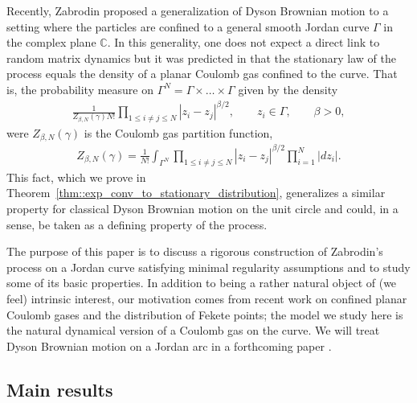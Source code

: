 \documentclass[11pt]{article}
\numberwithin{equation}{section}
\theoremstyle{definition}
\begin{document}
Recently, Zabrodin \cite{zabrodin2023dyson} proposed a generalization of Dyson Brownian motion to a setting where the particles are confined to a general smooth Jordan curve $\Gamma$ in the complex plane $\mathbb{C}$. In this generality, one does not expect a direct link to random matrix dynamics but it was predicted in \cite{zabrodin2023dyson} that the stationary law of the process equals the density of a planar Coulomb gas confined to the curve. That is, the probability measure on $\Gamma^{N} = \Gamma\times\dots\times\Gamma$ given by the density
\begin{align}\label{def:coulomb-gas-density}
    \frac{1}{Z_{\beta,N}(\gamma) N!}\prod_{1 \le i \neq j \le N} |z_i -z_j|^{\beta/2},\qquad z_{i}\in\Gamma, \qquad \beta > 0,
\end{align}
were $Z_{\beta,N}(\gamma)$ is the Coulomb gas partition function,
\begin{align}\label{def:partition-function}
    Z_{\beta,N}(\gamma) = \frac{1}{N!}\int_{\Gamma^{N}}\prod_{1 \le i \neq j \le N} |z_i -z_j|^{\beta/2}\prod_{i=1}^{N}|dz_{i}|.
\end{align}
 This fact, which we prove in Theorem~\ref{thm::exp_conv_to_stationary_distribution}, generalizes a similar property for classical Dyson Brownian motion on the unit circle and could, in a sense, be taken as a defining property of the process. 

The purpose of this paper is to discuss a rigorous construction of Zabrodin's process on a Jordan curve satisfying minimal regularity assumptions and to study some of its basic properties. In addition to being a rather natural object of (we feel) intrinsic interest, our motivation comes from recent work \cite{WiegmannZabrodin2022_DysonGasCurvedContour, Kurtsego, johansson2023coulomb, courteaut2025planar} on confined planar Coulomb gases and the distribution of Fekete points; the model we study here is the natural dynamical version of a Coulomb gas on the curve. We will treat Dyson Brownian motion on a Jordan arc in a forthcoming paper \cite{jordan-arc-paper}.
\subsection{Main results}
\end{document}
